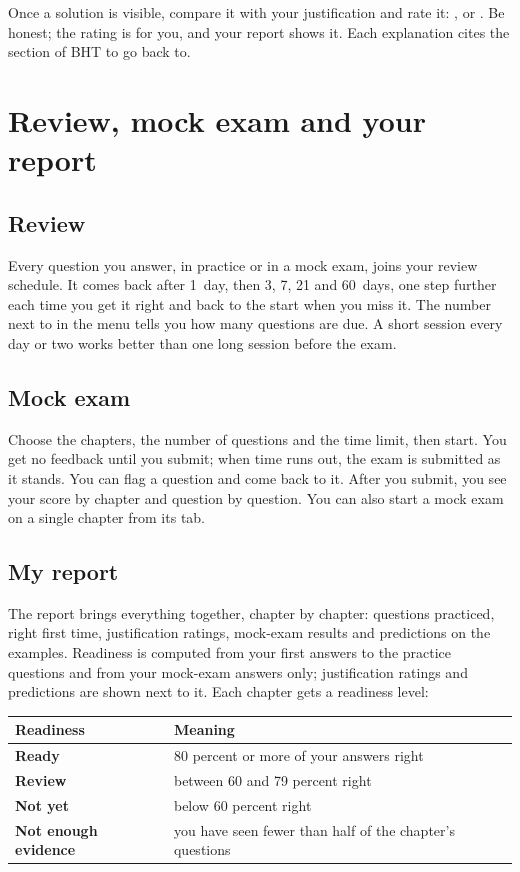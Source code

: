 Once a solution is visible, compare it with your justification and rate it: ,  or . Be honest; the rating is for you, and your report shows it. Each explanation cites the section of BHT to go back to.


\section{Review, mock exam and your report}

\subsection{Review}
Every question you answer, in practice or in a mock exam, joins your review schedule. It comes back after 1~day, then 3, 7, 21 and 60~days, one step further each time you get it right and back to the start when you miss it. The number next to  in the menu tells you how many questions are due. A short session every day or two works better than one long session before the exam.

\subsection{Mock exam}
Choose the chapters, the number of questions and the time limit, then start. You get no feedback until you submit; when time runs out, the exam is submitted as it stands. You can flag a question and come back to it. After you submit, you see your score by chapter and question by question. You can also start a mock exam on a single chapter from its  tab.

\subsection{My report}
The report brings everything together, chapter by chapter: questions practiced, right first time, justification ratings, mock-exam results and predictions on the examples. Readiness is computed from your first answers to the practice questions and from your mock-exam answers only; justification ratings and predictions are shown next to it. Each chapter gets a readiness level:

\begin{center}
\begin{tabularx}{0.86\linewidth}{@{}>{\sffamily\bfseries}l X@{}}
\toprule
\normalfont\textsf{\textbf{Readiness}} & \textsf{\textbf{Meaning}} \\
\midrule
Ready & 80 percent or more of your answers right \\
Review & between 60 and 79 percent right \\
Not yet & below 60 percent right \\
Not enough evidence & you have seen fewer than half of the chapter's questions \\
\bottomrule
\end{tabularx}
\end{center}

